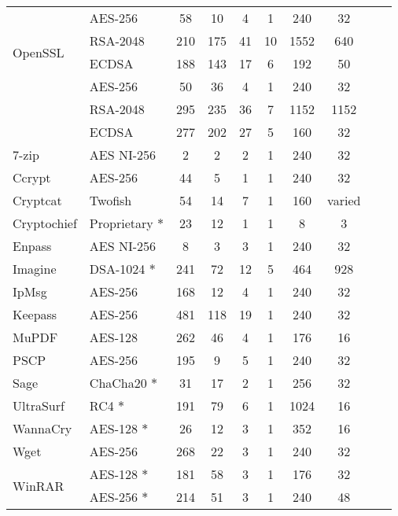 \begin{table}[t]
{\begin{tabular}{l l c c c c c ccc}
\midrule
\multirow{4}{*}{OpenSSL}	& AES-256			& 58 & 10 & 4		& 1 & 240 & 32 \\
							& RSA-2048			& 210 & 175 & 41	& 10 & 1552 & 640 \\
							& ECDSA	& 188 & 143 & 17	& 6 & 192 & 50 \\
\midrule
\multirow{4}{*}{WolfSSL}	& AES-256			& 50 & 36 & 4		& 1 & 240 & 32 \\
							& RSA-2048			& 295 & 235 & 36	& 7 & 1152 & 1152 \\
							& ECDSA	& 277 & 202 & 27	& 5 & 160 & 32 \\
\midrule
\midrule
7-zip						& AES NI-256		& 2 & 2 & 2	 		& 1 & 240	& 32 \\
\midrule
Ccrypt 						& AES-256			& 44 & 5 & 1	 	& 1 & 240	& 32 \\
\midrule
Cryptcat					& Twofish			& 54 & 14 & 7		& 1 & 160	& varied \\
\midrule
Cryptochief 				& Proprietary $\ast$	& 23 & 12 & 1		& 1 & 8		& 3 \\
\midrule
Enpass 						& AES NI-256		& 8 & 3 & 3	 		& 1 & 240	& 32 \\
\midrule
Imagine						& DSA-1024 $\ast$	& 241 & 72 & 12	 	& 5 & 464	& 928 \\ %
\midrule
IpMsg						& AES-256			& 168 & 12 & 4		& 1 & 240	& 32 \\
\midrule
Keepass						& AES-256			& 481 & 118 & 19	& 1 & 240 & 32 \\
\midrule
MuPDF						& AES-128			& 262 & 46 & 4	 	& 1 & 176	& 16 \\
\midrule
PSCP						& AES-256			& 195 & 9 & 5		& 1 & 240	&  32 \\
\midrule
Sage						& ChaCha20 $\ast$	& 31 & 17 & 2		& 1 & 256	& 32 \\
\midrule
UltraSurf					& RC4 $\ast$		& 191 & 79 & 6		& 1 & 1024 & 16 \\
\midrule
WannaCry					& AES-128 $\ast$	& 26 & 12 & 3	 	& 1 & 352	& 16 \\
\midrule
Wget						& AES-256			& 268 & 22 & 3		& 1 & 240	& 32 \\
\midrule
\multirow{2}{*}{WinRAR} 	& AES-128 $\ast$	& 181 & 58 & 3		& 1 & 176	& 32 \\
 							& AES-256 $\ast$	& 214 & 51 & 3	 	& 1 & 240	& 48 \\
\bottomrule



\end{tabular}}
\end{table}
